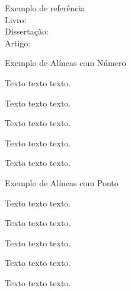 \begin{quadro}[!h]
    \centering
\end{quadro}

\newpage

\begin{center}
    Exemplo de referência \\
    Livro: \cite{knuth} \\ Dissertação: \cite{Maia2011} \\ Artigo: \cite{lamport1986latex}
\end{center}

\begin{center}
    Exemplo de Alíneas com Número
\end{center}
\begin{alineascomnumero}
    \item Texto texto texto.
    \item Texto texto texto.
    \item Texto texto texto.
    \item Texto texto texto.
    \item Texto texto texto.
\end{alineascomnumero}

\begin{center}
    Exemplo de Alíneas com Ponto
\end{center}
\begin{alineascomponto}
    \item Texto texto texto.
    \item Texto texto texto.
    \item Texto texto texto.
    \begin{subalineascomponto}
        \item Texto texto texto.
        \item Texto texto texto.
    \end{subalineascomponto}
\end{alineascomponto}